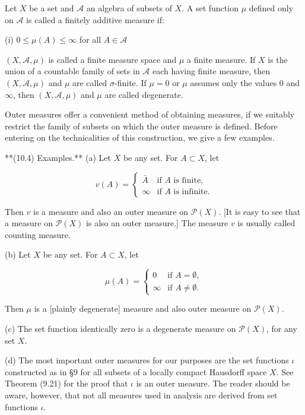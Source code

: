 Let $X$ be a set and $\mathcal{A}$ an algebra of subsets of $X$. A set function $\mu$ defined only on $\mathcal{A}$ is called a finitely additive measure if:

(i) $0 \leq \mu(A) \leq \infty$ for all $A \in \mathcal{A}$

$(X, \mathcal{A}, \mu)$ is called a finite measure space and $\mu$ a finite measure. If $X$ is the union of a countable family of sets in $\mathcal{A}$ each having finite measure, then $(X, \mathcal{A}, \mu)$ and $\mu$ are called $\sigma$-finite. If $\mu = 0$ or $\mu$ assumes only the values 0 and $\infty$, then $(X, \mathcal{A}, \mu)$ and $\mu$ are called degenerate.

Outer measures offer a convenient method of obtaining measures, if we suitably restrict the family of subsets on which the outer measure is defined. Before entering on the technicalities of this construction, we give a few examples.

**(10.4) Examples.** (a) Let $X$ be any set. For $A \subset X$, let

$$v(A) = \begin{cases} \bar{A} & \text{if } A \text{ is finite}, \\ \infty & \text{if } A \text{ is infinite}. \end{cases}$$

Then $v$ is a measure and also an outer measure on $\mathcal{P}(X)$. [It is easy to see that a measure on $\mathcal{P}(X)$ is also an outer measure.] The measure $v$ is usually called counting measure.

(b) Let $X$ be any set. For $A \subset X$, let

$$\mu(A) = \begin{cases} 0 & \text{if } A = \emptyset, \\ \infty & \text{if } A \neq \emptyset. \end{cases}$$

Then $\mu$ is a [plainly degenerate] measure and also outer measure on $\mathcal{P}(X)$.

(c) The set function identically zero is a degenerate measure on $\mathcal{P}(X)$, for any set $X$.

(d) The most important outer measures for our purposes are the set functions $\iota$ constructed as in §9 for all subsets of a locally compact Hausdorff space $X$. See Theorem (9.21) for the proof that $\iota$ is an outer measure. The reader should be aware, however, that not all measures used in analysis are derived from set functions $\iota$.

